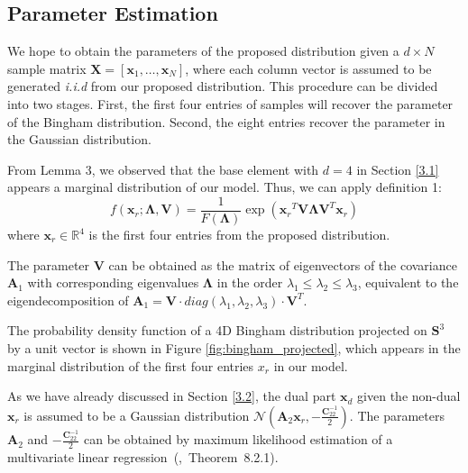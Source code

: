 \documentclass[micromachines,article,accept,pdftex,moreauthors]{Definitions/mdpi}
\begin{document}

\subsection{Parameter Estimation} \label{3.4}
We hope to obtain the parameters of the proposed distribution given a $d \times N$ sample matrix $\boldsymbol{X} = [\boldsymbol{x}_{1}, \dots, \boldsymbol{x}_{N}]$, where each column vector is assumed to be generated \textit{i.i.d} from our proposed distribution. This procedure can be divided into two stages. First, the first four entries of samples will recover the parameter of the Bingham distribution. Second, the eight entries recover the parameter in the Gaussian distribution.

From Lemma 3, we observed that the base element with $d=4$ in {Section \ref{3.1}} appears a marginal distribution of our model. Thus, we can apply definition 1:
\begin{equation} \label{eq:11}
f(\boldsymbol{x}_r; \boldsymbol{\Lambda}, \boldsymbol{V})=\frac{1}{F(\boldsymbol{\Lambda})} \exp \left({\boldsymbol{x}_r}^{T} \boldsymbol{V} \boldsymbol{\Lambda} \boldsymbol{V}^{T} {\boldsymbol{x}_r}\right) 
\end{equation}
where $\boldsymbol{x}_r \in \mathbb{R}^{4}$ is the first four entries from the proposed distribution.

The parameter $\boldsymbol{V}$ can be obtained as the matrix of eigenvectors of the covariance $\boldsymbol{A}_1$ with corresponding eigenvalues $\boldsymbol{\Lambda}$ in the order $\lambda_1 \leq \lambda_2 \leq \lambda_3$, equivalent to the eigendecomposition of $\boldsymbol{A}_1 = \boldsymbol{V} \cdot diag({\lambda_1, \lambda_2, \lambda_3}) \cdot \boldsymbol{V}^T$.

The probability density function of a 4D Bingham distribution projected on $\mathbf{S}^{3}$ by a unit vector is shown in Figure \ref{fig:bingham_projected}, which appears in the marginal distribution of the first four entries $x_r$ in our model.

As we have already discussed in Section \ref{3.2}, the dual part $\boldsymbol{x}_d$ given the non-dual $\boldsymbol{x}_r$ is assumed to be a Gaussian distribution $\mathcal{N}(\boldsymbol{A}_2 \boldsymbol{x}_r, -\frac{\boldsymbol{C}_{22}^{-1}}{2})$. The parameters $\boldsymbol{A}_2$ and $-\frac{\boldsymbol{C}_{22}^{-1}}{2}$ can be obtained by maximum likelihood estimation of a multivariate linear regression~\mbox{(\cite{andersonIntroductionMultivariateStatistical2003}, Theorem 8.2.1).}
\end{document}
